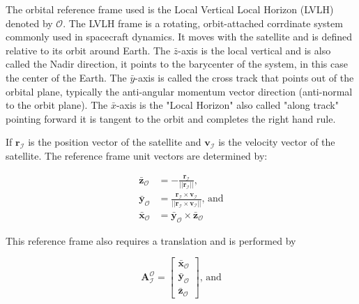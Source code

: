 
The orbital reference frame used is the Local Vertical Local Horizon (LVLH) denoted by $\mathcal{O}$. The LVLH frame is a rotating, orbit-attached corrdinate
system commonly used in spacecraft dynamics. It moves with the satellite and is defined relative to its orbit around Earth. The $\bar{z}$-axis is the local vertical and is 
also called the Nadir direction, it points to the barycenter of the system, in this case the center of the Earth. The $\bar{y}$-axis is called the cross track that points 
out of the orbital plane, typically the anti-angular momentum vector direction (anti-normal to the orbit plane). The $\bar{x}$-axis is the "Local Horizon" also called
"along track" pointing forward it is tangent to the orbit and completes the right hand rule.
\vspace{0.5cm}

\noindent If $\mathbf{r}_\mathcal{I}$ is the position vector of the satellite and $\mathbf{v}_\mathcal{I}$ is the velocity vector of the satellite.
The reference frame unit vectors are determined by:

\begin{align}
    \mathbf{\bar{z}}_{\mathcal{O}} &= -\frac{\mathbf{r}_\mathcal{I}}{||\mathbf{r}_\mathcal{I}||}\text{,} \\
    \mathbf{\bar{y}}_{\mathcal{O}} &= \frac{\mathbf{r}_\mathcal{I}\times\mathbf{v}_\mathcal{I}}{||\mathbf{r}_\mathcal{I}\times\mathbf{v}_\mathcal{I}||}\text{, and}\\
    \mathbf{\bar{x}}_{\mathcal{O}} &= \mathbf{\bar{y}}_{\mathcal{O}}\times\mathbf{\bar{z}}_{\mathcal{O}}
\end{align}

\noindent This reference frame also requires a translation and is performed by

\begin{equation}
    \mathbf{A}_{\mathcal{I}}^{\mathcal{O}} = 
    \begin{bmatrix}
            \mathbf{\bar{x}}_{\mathcal{O}} \\
            \mathbf{\bar{y}}_{\mathcal{O}} \\
            \mathbf{\bar{z}}_{\mathcal{O}}
    \end{bmatrix}
    \text{, and}
\end{equation}


